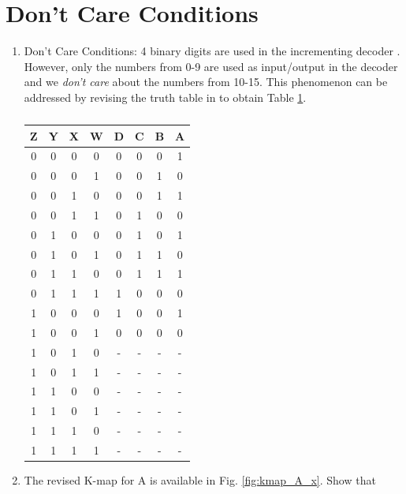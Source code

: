 \documentclass[journal,12pt,twocolumn]{IEEEtran}
\begin{document}
\section{Don't Care Conditions}
\begin{enumerate}[1.]
\item {Don't Care Conditions: }
4 binary digits are used in the incrementing decoder \cite{gvv_kmap}.  However, only the numbers from 0-9 are used as input/output
in the decoder and we {\em don't care} about the numbers from 10-15.  This phenomenon can be addressed by revising the truth table in \cite{gvv_kmap}
to obtain Table \ref{table:dont_care_table}.
\begin{table}[h!]
	\begin{center}
		\begin{tabular}{ |c|c|c|c|c|c|c|c| } 
			\hline
			Z & Y & X & W & \textbf{D} & \textbf{C} & \textbf{B} & \textbf{A}  \\ 
			\hline
			0 & 0 & 0 & 0 & 0 & 0 & 0 & 1  \\ 
			\hline
			0 & 0 & 0 & 1 & 0 & 0 & 1 & 0  \\ 
			\hline
			0 & 0 & 1 & 0 & 0 & 0 & 1 & 1  \\ 
			\hline
			0 & 0 & 1 & 1 & 0 & 1 & 0 & 0  \\
			\hline
			0 & 1 & 0 & 0 & 0 & 1 & 0 & 1  \\
			\hline
			0 & 1 & 0 & 1 & 0 & 1 & 1 & 0  \\
			\hline
			0 & 1 & 1 & 0 & 0 & 1 & 1 & 1  \\ 
			\hline
			0 & 1 & 1 & 1 & 1 & 0 & 0 & 0  \\
			\hline
			1 & 0 & 0 & 0 & 1 & 0 & 0 & 1  \\
			\hline
			1 & 0 & 0 & 1 & 0 & 0 & 0 & 0  \\ 
			\hline
				1 & 0 & 1 & 0 & - & - & - & -  \\ 
			\hline
				1 & 0 & 1 & 1 & - & - & - & -  \\ 
			\hline
				1 & 1 & 0 & 0 & - & - & - & -  \\ 
			\hline
				1 & 1 & 0 & 1 & - & - & - & -  \\ 
			\hline
				1 & 1 & 1 & 0 & - & - & - & -  \\ 
			\hline
				1 & 1 & 1 & 1 & - & - & - & -  \\ 
			\hline
		\end{tabular}
\caption{}
\label{table:dont_care_table}
\end{center}
\end{table}
\item  The revised K-map for A is available in Fig. \ref{fig:kmap_A_x}.  Show that 

\end{enumerate}
\end{document}
